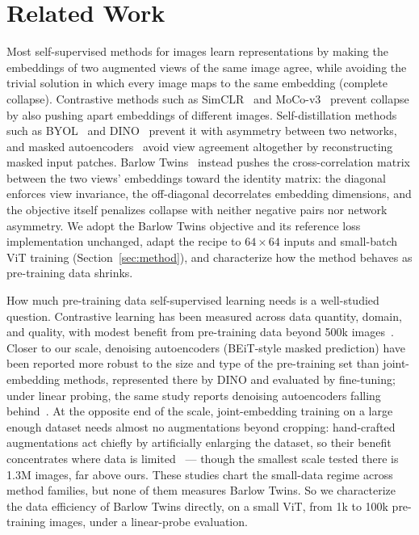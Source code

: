 \section{Related Work}
\label{sec:related_work}

Most self-supervised methods for images learn representations by making the
embeddings of two augmented views of the same image agree, while avoiding the
trivial solution in which every image maps to the same embedding (complete
collapse). Contrastive methods such as SimCLR~\cite{chen2020simclr} and
MoCo-v3~\cite{chen2021mocov3} prevent collapse by also pushing apart
embeddings of different images. Self-distillation methods such as
BYOL~\cite{grill2020byol} and DINO~\cite{caron2021dino} prevent it with
asymmetry between two networks, and masked autoencoders~\cite{he2022mae}
avoid view agreement altogether by reconstructing masked input patches.
Barlow Twins~\cite{zbontar2021barlow} instead pushes the cross-correlation
matrix between the two views' embeddings toward the identity matrix: the
diagonal enforces view invariance, the off-diagonal decorrelates embedding
dimensions, and the objective itself penalizes collapse with neither negative
pairs nor network asymmetry. We adopt the Barlow Twins objective and its
reference loss implementation unchanged, adapt the recipe to $64\times64$
inputs and small-batch ViT training (Section~\ref{sec:method}), and
characterize how the method behaves as pre-training data shrinks.

How much pre-training data self-supervised learning needs is a well-studied
question. Contrastive learning has been measured across data quantity,
domain, and quality, with modest benefit from pre-training data beyond 500k
images~\cite{cole2022when}. Closer to our scale, denoising autoencoders
(BEiT-style masked prediction) have been reported more robust to the size and
type of the pre-training set than joint-embedding methods, represented there
by DINO and evaluated by fine-tuning; under linear probing, the same study
reports denoising autoencoders falling
behind~\cite{elnouby2021largescale}. At the opposite end of the scale,
joint-embedding training on a large enough dataset needs almost no
augmentations beyond cropping: hand-crafted augmentations act chiefly by
artificially enlarging the dataset, so their benefit concentrates where data
is limited~\cite{moutakanni2024you} --- though the smallest scale tested
there is 1.3M images, far above ours. These studies chart the small-data
regime across method families, but none of them measures Barlow Twins. So we
characterize the data efficiency of Barlow Twins directly, on a small ViT,
from 1k to 100k pre-training images, under a linear-probe evaluation.

